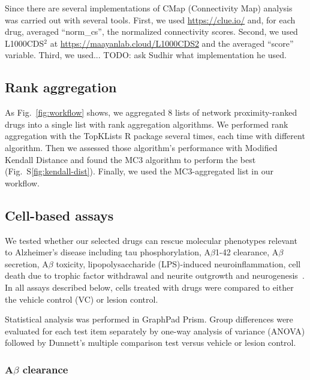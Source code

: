 \documentclass[letterpaper]{article}
\begin{document}
Since there are several implementations of CMap (Connectivity Map) analysis was carried out with several tools.  First, we used
\url{https://clue.io/} \citep{Lamb2006} and, for each drug, averaged
``norm\_cs'',
the normalized connectivity scores.  Second, we used L1000CDS$^2$ at
\url{https://maayanlab.cloud/L1000CDS2} and the averaged ``score'' variable.
Third, we used... TODO: ask Sudhir what implementation he used.

\subsection{Rank aggregation}

As Fig.~\ref{fig:workflow} shows, we aggregated 8 lists of network
proximity-ranked drugs into a single list with rank aggregation algorithms.
We performed rank aggregation with the TopKLists R package
several times, each time with different algorithm.  Then we assessed those
algorithm's performance with Modified Kendall Distance and found the MC3
algorithm to perform the best (Fig.~S\ref{fig:kendall-dist}).  Finally, we
used the MC3-aggregated list in our workflow.

\subsection{Cell-based assays}

We tested whether our selected drugs can rescue molecular phenotypes relevant
to Alzheimer's disease including tau phosphorylation, A$\beta$1-42 clearance,
A$\beta$ secretion, A$\beta$ toxicity, lipopolysaccharide (LPS)-induced
neuroinflammation, cell death due to trophic factor withdrawal and neurite
outgrowth and neurogenesis~\citep{Varma2020,Desai2022a}. In all assays
described below, cells treated with drugs were compared to either the vehicle
control (VC) or lesion control.

Statistical analysis was performed in GraphPad Prism. Group differences
were evaluated for each test item separately by one-way analysis of variance
(ANOVA) followed by Dunnett's multiple comparison test versus vehicle or
lesion control.

\subsubsection{A$\beta$ clearance}
\end{document}

